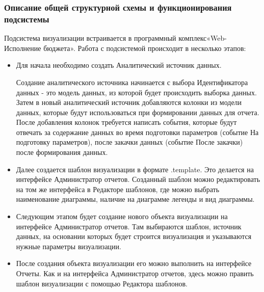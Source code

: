 \documentclass[a4paper]{extarticle}
\begin{document}
\subsubsection{Описание общей структурной схемы и функционирования подсистемы}
Подсистема визуализации встраивается в программный комплекс\newline «Web-Исполнение бюджета». Работа с подсистемой происходит в несколько этапов:\par
\begin{itemize}
  \item Для начала необходимо создать Аналитический источник данных.\par
  Создание аналитического источника начинается с выбора Идентификатора данных - это модель данных, из которой будет происходить выборка данных. Затем в новый аналитический источник добавляются колонки из модели данных, которые будут использоваться при формировании данных для отчета. После добавления колонок требуется написать события, которые будут отвечать за содержание данных во время подготовки параметров (событие На подготовку параметров), после закачки данных (событие После закачки) после формирования данных.
  \item Далее создается шаблон визуализации в формате .template. Это делается на интерфейсе Администратор отчетов.
  Созданный шаблон можно редактировать на том же интерфейса в Редакторе шаблонов, где можно выбрать наименование диаграммы, наличие на диаграмме легенды и вид диаграммы.
  \item Следующим этапом будет создание нового объекта визуализации на интерфейсе Администратор отчетов. Там выбираются шаблон, источник данных, на основании которых будет строится визуализация и указываются нужные параметры визуализации.
  \item После создания объекта визуализации его можно выполнить на интерфейсе Отчеты. Как и на интерфейса Администратор отчетов, здесь можно править шаблон визуализации с помощью Редактора шаблонов.
\end{itemize}\par
\end{document}
